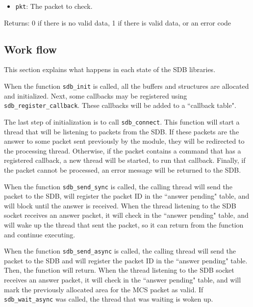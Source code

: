 \documentclass[12pt,a4paper]{report}
\begin{document}
\begin{itemize}
\item \texttt{pkt}: The packet to check.
\end{itemize}

Returns: 0 if there is no valid data, 1 if there is valid data, or an error code

\subsection*{Work flow}
This section explains what happens in each state of the SDB libraries.

When the function \texttt{sdb\_init} is called, all the buffers and structures are allocated and initialized. Next, some callbacks may be registered using \texttt{sdb\_register\_callback}. These callbacks will be added to a ``callback table".

The last step of initialization is to call \texttt{sdb\_connect}. This function will start a thread that will be listening to packets from the SDB. If these packets are the answer to some packet sent previously by the module, they will be redirected to the processing thread. Otherwise, if the packet contains a command that has a registered callback, a new thread will be started, to run that callback. Finally, if the packet cannot be processed, an error message will be returned to the SDB.

When the function \texttt{sdb\_send\_sync} is called, the calling thread will send the packet to the SDB, will register the packet ID in the ``answer pending" table, and will block until the answer is received. When the thread listening to the SDB socket receives an answer packet, it will check in the ``answer pending" table, and will wake up the thread that sent the packet, so it can return from the function and continue executing.

When the function \texttt{sdb\_send\_async} is called, the calling thread will send the packet to the SDB and will register the packet ID in the ``answer pending" table. Then, the function will return. When the thread listening to the SDB socket receives an answer packet, it will check in the ``answer pending" table, and will mark the previously allocated area for the MCS packet as valid. If \texttt{sdb\_wait\_async} was called, the thread that was waiting is woken up.
\end{document}
